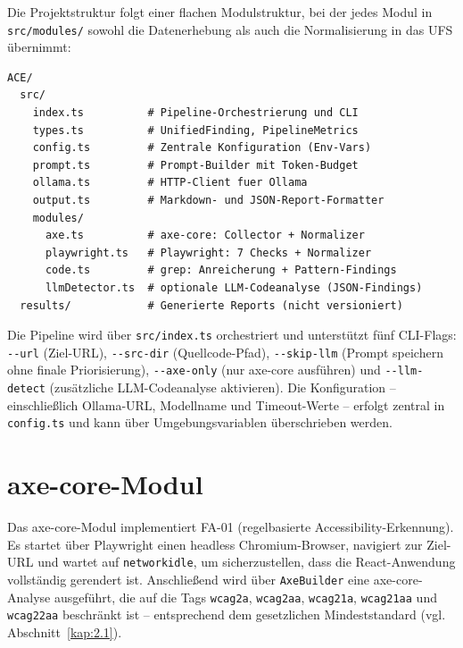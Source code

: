 Die Projektstruktur folgt einer flachen Modulstruktur, bei der jedes Modul in \texttt{src/modules/} sowohl die Datenerhebung als auch die Normalisierung in das \ac{UFS} übernimmt:

\begin{lstlisting}[language={}, caption={Projektstruktur des \acs{PoC}}, label={lst:projektstruktur}]
ACE/
  src/
    index.ts          # Pipeline-Orchestrierung und CLI
    types.ts          # UnifiedFinding, PipelineMetrics
    config.ts         # Zentrale Konfiguration (Env-Vars)
    prompt.ts         # Prompt-Builder mit Token-Budget
    ollama.ts         # HTTP-Client fuer Ollama
    output.ts         # Markdown- und JSON-Report-Formatter
    modules/
      axe.ts          # axe-core: Collector + Normalizer
      playwright.ts   # Playwright: 7 Checks + Normalizer
      code.ts         # grep: Anreicherung + Pattern-Findings
      llmDetector.ts  # optionale LLM-Codeanalyse (JSON-Findings)
  results/            # Generierte Reports (nicht versioniert)
\end{lstlisting}

Die Pipeline wird über \texttt{src/index.ts} orchestriert und unterstützt fünf CLI-Flags: \texttt{-{}-url} (Ziel-URL), \texttt{-{}-src-dir} (Quellcode-Pfad), \texttt{-{}-skip-llm} (Prompt speichern ohne finale Priorisierung), \texttt{-{}-axe-only} (nur axe-core ausführen) und \texttt{-{}-llm-detect} (zusätzliche LLM-Codeanalyse aktivieren). Die Konfiguration -- einschließlich Ollama-URL, Modellname und Timeout-Werte -- erfolgt zentral in \texttt{config.ts} und kann über Umgebungsvariablen überschrieben werden.

\section{axe-core-Modul}
\label{sec:impl-axe}

Das axe-core-Modul implementiert \ac{FA}-01 (regelbasierte Accessibility-Erkennung). Es startet über Playwright einen headless Chromium-Browser, navigiert zur Ziel-URL und wartet auf \texttt{networkidle}, um sicherzustellen, dass die React-Anwendung vollständig gerendert ist. Anschließend wird über \texttt{AxeBuilder} eine axe-core-Analyse ausgeführt, die auf die Tags \texttt{wcag2a}, \texttt{wcag2aa}, \texttt{wcag21a}, \texttt{wcag21aa} und \texttt{wcag22aa} beschränkt ist -- entsprechend dem gesetzlichen Mindeststandard (vgl. Abschnitt~\ref{kap:2.1}).

